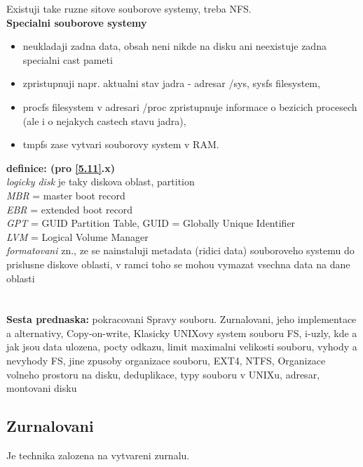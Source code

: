 \documentclass[a4paper, 11pt]{article}
\begin{document}
\noindent Existuji take ruzne sitove souborove systemy, treba NFS. \\

\noindent\textbf{Specialni souborove systemy}
\begin{itemize}
    \item neukladaji zadna data, obsah neni nikde na disku ani neexistuje zadna specialni cast pameti
    \item zpristupnuji napr. aktualni stav jadra - adresar /sys, sysfs filesystem,
    \item procfs filesystem v adresari /proc zpristupnuje informace o bezicich procesech (ale i o nejakych castech stavu jadra),
    \item tmpfs zase vytvari souborovy system v RAM. \\
\end{itemize}

\noindent\textbf{definice: (pro \ref{5.11}.x)} \\[0.5em]
\textit{logicky disk} je taky diskova oblast, partition \\[0.2em]
\textit{MBR} = master boot record \\[0.2em]
\textit{EBR} = extended boot record \\[0.2em]
\textit{GPT} = GUID Partition Table, GUID = Globally Unique Identifier \\[0.2em]
\textit{LVM} = Logical Volume Manager \\[0.2em]
\textit{formatovani} zn., ze se nainstaluji metadata (ridici data) souboroveho systemu do prislusne diskove oblasti, v ramci toho se mohou vymazat vsechna data na dane oblasti \\[0.2em]

\newpage
\setlength{\parindent}{0pt}

\section{}
\textbf{Sesta prednaska:} pokracovani Spravy souboru. Zurnalovani, jeho implementace a alternativy, Copy-on-write, Klasicky UNIXovy system souboru FS, i-uzly, kde a jak jsou data ulozena, pocty odkazu, limit maximalni velikosti souboru, vyhody a nevyhody FS, jine zpusoby organizace souboru, EXT4, NTFS, Organizace volneho prostoru na disku, deduplikace, typy souboru v UNIXu, adresar, montovani disku
\subsection{Zurnalovani}
Je technika zalozena na vytvareni zurnalu.  \\
\end{document}
